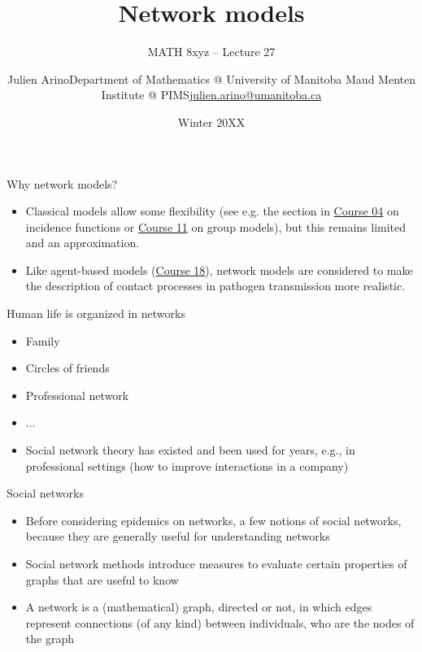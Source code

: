 \documentclass[aspectratio=169]{beamer}\usepackage[]{graphicx}\usepackage[]{xcolor}
\subtitle{MATH 8xyz -- Lecture 27}
\author{\texorpdfstring{Julien Arino\newline Department of Mathematics @ University of Manitoba \newline Maud Menten Institute @ PIMS\newline\url{julien.arino@umanitoba.ca}}{Julien Arino}}
\date{Winter 20XX}
\title{Network models}
\begin{document}

\begin{frame}{Why network models?}
  \begin{itemize}
    \item Classical models allow some flexibility (see e.g. the section in \href{https://julien-arino.github.io/petit-cours-epidemio-mathematique/cours-04-modeles-SIS-SIR.html}{Course 04} on incidence functions or \href{https://julien-arino.github.io/petit-cours-epidemio-mathematique/cours-11-modeles-groupes.html}{Course 11} on group models), but this remains limited and an approximation.
    \item Like agent-based models (\href{https://julien-arino.github.io/petit-cours-epidemio-mathematique/cours-18-modeles-agents.html}{Course 18}), network models are considered to make the description of contact processes in pathogen transmission more realistic.
  \end{itemize}
\end{frame}

\begin{frame}{Human life is organized in networks}
  \begin{itemize}
    \item Family
    \item Circles of friends
    \item Professional network
    \item ...
    \item Social network theory has existed and been used for years, e.g., in professional settings (how to improve interactions in a company)
  \end{itemize}
\end{frame}

\begin{frame}{Social networks}
  \begin{itemize}
    \item Before considering epidemics on networks, a few notions of social networks, because they are generally useful for understanding networks
    \item Social network methods introduce measures to evaluate certain properties of graphs that are useful to know
    \item A network is a (mathematical) graph, directed or not, in which edges represent connections (of any kind) between individuals, who are the nodes of the graph
  \end{itemize}
\end{frame}
\end{document}
